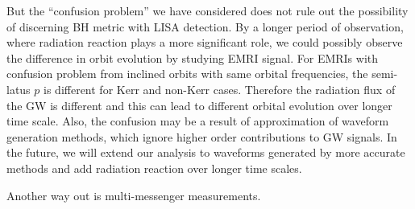 \documentclass{article}
\begin{document}
But the ``confusion problem'' we have considered does not rule out the possibility of discerning BH metric with LISA detection. By a longer period of observation, where radiation reaction plays a more significant role, we could possibly observe the difference in orbit evolution by studying EMRI signal. For EMRIs with confusion problem from inclined orbits with same orbital frequencies, the semi-latus $p$ is different for Kerr and non-Kerr cases. Therefore the radiation flux of the GW is different and this can lead to different orbital evolution over longer time scale. Also, the confusion may be a result of approximation of waveform generation methods, which ignore higher order contributions to GW signals. In the future, we will extend our analysis to waveforms generated by more accurate methods and add radiation reaction over longer time scales. 

Another way out is multi-messenger measurements. \cite{measureBHspin}




\end{document}

